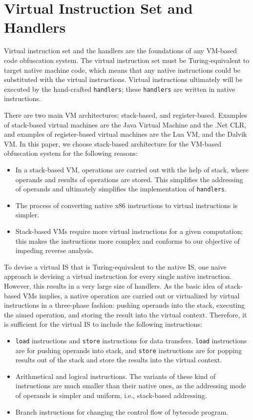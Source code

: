 \section{Virtual Instruction Set and Handlers}\label{sec:VIS-Handlers}
Virtual instruction set and the handlers are the foundations of any VM-based code obfuscation system. The virtual instruction set must be Turing-equivalent to target native machine code, which means that any native instructions could be substituted with the virtual instructions. Virtual instructions ultimately will be executed by the hand-crafted \texttt{handlers}; these \texttt{handlers} are written in native instructions.

There are two main VM architectures: stack-based, and register-based. Examples of stack-based virtual machines are the Java Virtual Machine and the .Net CLR, and examples of register-based virtual machines are the Lua VM, and the Dalvik VM. In this paper, we choose stack-based architecture for the VM-based obfuscation system for the following reasons:
\begin{itemize}
  \item In a stack-based VM, operations are carried out with the help of stack, where operands and results of operations are stored. This simplifies the addressing of operands and ultimately simplifies the implementation of \texttt{handlers}.
  \item The process of converting native x86 instructions to virtual instructions is simpler.
  \item Stack-based VMs require more virtual instructions for a given computation; this makes the instructions more complex and conforms to our objective of impeding reverse analysis.
\end{itemize}

To devise a virtual IS that is Turing-equivalent to the native IS, one naive approach is devising a virtual instruction for every single native instruction. However, this results in a very large size of handlers. As the basic idea of stack-based VMs implies, a native operation are carried out or virtualized by virtual instructions in a three-phase fashion: pushing operands into the stack, executing the aimed operation, and storing the result into the virtual context. Therefore, it is sufficient for the virtual IS to include the following instructions:
\begin{itemize}
  \item \texttt{load} instructions and \texttt{store} instructions for data transfers. \texttt{load} instructions are for pushing operands into stack, and \texttt{store} instructions are for popping results out of the stack and store the results into the virtual context.
  \item Arithmetical and logical instructions. The variants of these kind of instructions are much smaller than their native ones, as the addressing mode of operands is simpler and uniform, i.e., stack-based addressing.
  \item Branch instructions for changing the control flow of bytecode program.
\end{itemize}

